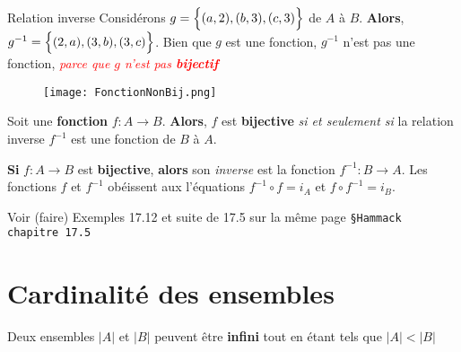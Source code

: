 \documentclass[16pt]{report}
\begin{document}
\begin{multicols*}{2}
            \begin{EExample}{Relation inverse}{}
                Considérons $g = \Bigl\{ (a, 2), (b, 3), (c, 3) \Bigr\}$ de $A$ à $B$. \textbf{Alors}, 
                $g^{-1} = \Bigl\{ (2, a), (3, b), (3, c) \Bigr\}$. Bien que $g$ est une fonction, 
                $g^{-1}$ n'est pas une fonction, \textcolor{red}{\textit{parce que $g$ n'est pas \textbf{bijectif}}} 
            \end{EExample}


            \begin{figure}[H]
                \begin{center}
                    \texttt{[image: FonctionNonBij.png]}
                \end{center}
            \end{figure}


            \begin{Theorem}{}{}
                Soit une \textbf{fonction}   $f : A \rightarrow  B$. \textbf{Alors}, $f$ est \textbf{bijective}
                \textit{si et seulement si} la relation inverse $f^{-1}$ est une fonction de 
                $B$ à $A$. 
            \end{Theorem}


            \begin{Theorem}{}{}
                \textbf{Si} $f : A \rightarrow  B$ est \textbf{bijective}, \textbf{alors} son 
                \textit{inverse} est la fonction $f^{-1} : B \rightarrow  A$. Les fonctions $f$ et $f^{-1}$ 
                obéissent aux l'équations $f^{-1} \circ f = i_A$ et $f \circ f^{-1} = i_B$. 
            \end{Theorem}


            \begin{note}{}{}
            Voir (faire) Exemples 17.12 et suite de 17.5 sur la même page \texttt{\small{\S Hammack chapitre 17.5}}
            \end{note}



    \chapter{Cardinalité des ensembles}


            \begin{note}{}{}
                Deux ensembles $|A|$ et $|B|$ peuvent être \textbf{infini} tout en étant tels que $|A| < |B|$  
            \end{note}



\end{multicols*}
\end{document}
